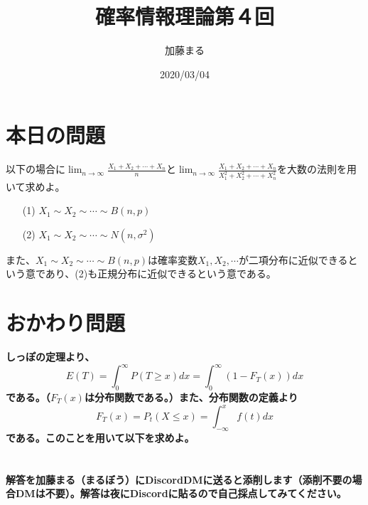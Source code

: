 \documentclass[a4j,uplatex]{jsarticle}
\title{確率情報理論第４回}
\author{加藤まる}
\date{2020/03/04}
\begin{document}
\maketitle

\section*{本日の問題}
以下の場合に$\displaystyle \lim_{n \to \infty} \frac{X_1 + X_2 + \cdots +X_n}{n}$と$\displaystyle \lim_{n \to \infty} \frac{X_1 + X_2 + \cdots +X_n}{X_1^2 + X_2^2 + \cdots +X_n^2}$を大数の法則を用いて求めよ。
\begin{itemize}
  \item[(1)] $X_1\sim X_2\sim \cdots \sim B(n,p)$
  \item[(2)] $X_1\sim X_2\sim \cdots \sim N(n,\sigma ^2)$
\end{itemize}
また、$X_1\sim X_2\sim \cdots \sim B(n,p)$は確率変数$X_1, X_2,\cdots$が二項分布に近似できるという意であり、(2)も正規分布に近似できるという意である。


\section*{おかわり問題}
\bf しっぽの定理\rm より、
\begin{equation}
  E(T)=\int_{0}^{\infty} P(T\ge x)dx = \int_{0}^{\infty} (1-F_T (x))dx
\end{equation}
である。（$F_T (x)$は分布関数である。）また、分布関数の定義より
\begin{equation}
  F_T(x) = P_t(X\le x) = \int_{-\infty}^{x} f(t)dx
\end{equation}
である。このことを用いて以下を求めよ。
\\
\\
\\
解答を加藤まる（まるぼう）にDiscordDMに送ると添削します（添削不要の場合DMは不要）。解答は夜にDiscordに貼るので自己採点してみてください。
\end{document}
